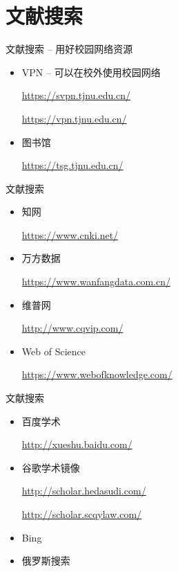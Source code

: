 \documentclass[10pt]{ctexbeamer}
\begin{document}
\section{文献搜索}
\begin{frame}{文献搜索 -- 用好校园网络资源}
    \begin{itemize}
        \item VPN  -- 可以在校外使用校园网络

        \href{https://svpn.tjnu.edu.cn/}{https://svpn.tjnu.edu.cn/}

        \href{https://vpn.tjnu.edu.cn/}{https://vpn.tjnu.edu.cn/}




        \item 图书馆

        \href{https://tsg.tjnu.edu.cn/}{https://tsg.tjnu.edu.cn/}
    \end{itemize}
\end{frame}


\begin{frame}{文献搜索}
    \begin{itemize}

        \item 知网

        \href{https://www.cnki.net/}{https://www.cnki.net/}

        \item 万方数据

        \href{https://www.wanfangdata.com.cn/}{https://www.wanfangdata.com.cn/}


        \item 维普网

        \href{http://www.cqvip.com/}{http://www.cqvip.com/}

        \item Web of Science

        \href{https://www.webofknowledge.com/}{https://www.webofknowledge.com/}
    \end{itemize}

\end{frame}

\begin{frame}{文献搜索}
    \begin{itemize}
        \item
        百度学术

        \href{http://xueshu.baidu.com/}{http://xueshu.baidu.com/}




        \item
        谷歌学术镜像

        \href{http://scholar.hedasudi.com/}{http://scholar.hedasudi.com/}

        \href{http://scholar.scqylaw.com/}{http://scholar.scqylaw.com/}

        \item
        Bing

        \item 俄罗斯搜索
    \end{itemize}

\end{frame}
\end{document}
